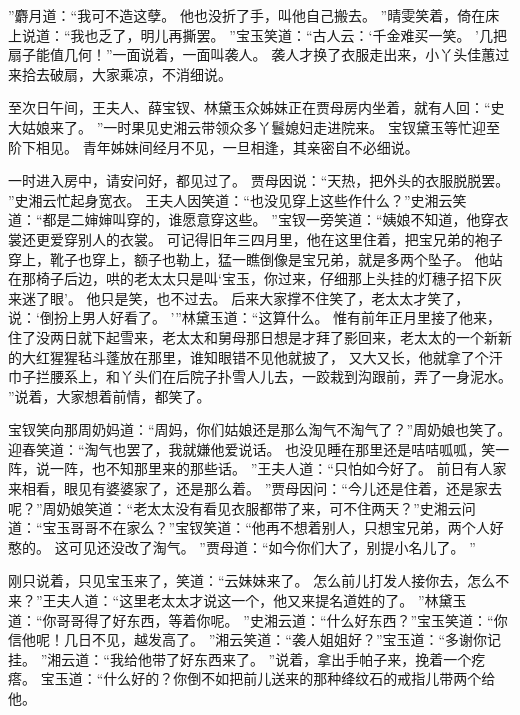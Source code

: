 ”麝月道：“我可不造这孽。
他也没折了手，叫他自己搬去。
”晴雯笑着，倚在床上说道：“我也乏了，明儿再撕罢。
”宝玉笑道：“古人云：‘千金难买一笑。
’几把扇子能值几何！”一面说着，一面叫袭人。
袭人才换了衣服走出来，小丫头佳蕙过来拾去破扇，大家乘凉，不消细说。
\par
至次日午间，王夫人、薛宝钗、林黛玉众姊妹正在贾母房内坐着，就有人回：“史大姑娘来了。
”一时果见史湘云带领众多丫鬟媳妇走进院来。
宝钗黛玉等忙迎至阶下相见。
青年姊妹间经月不见，一旦相逢，其亲密自不必细说。
\par
一时进入房中，请安问好，都见过了。
贾母因说：“天热，把外头的衣服脱脱罢。
”史湘云忙起身宽衣。
王夫人因笑道：“也没见穿上这些作什么？”史湘云笑道：“都是二婶婶叫穿的，谁愿意穿这些。
”宝钗一旁笑道：“姨娘不知道，他穿衣裳还更爱穿别人的衣裳。
可记得旧年三四月里，他在这里住着，把宝兄弟的袍子穿上，靴子也穿上，额子也勒上，猛一瞧倒像是宝兄弟，就是多两个坠子。
他站在那椅子后边，哄的老太太只是叫‘宝玉，你过来，仔细那上头挂的灯穗子招下灰来迷了眼’。
他只是笑，也不过去。
后来大家撑不住笑了，老太太才笑了，说：‘倒扮上男人好看了。
’”林黛玉道：“这算什么。
惟有前年正月里接了他来，住了没两日就下起雪来，老太太和舅母那日想是才拜了影回来，老太太的一个新新的大红猩猩毡斗蓬放在那里，谁知眼错不见他就披了，
又大又长，他就拿了个汗巾子拦腰系上，和丫头们在后院子扑雪人儿去，一跤栽到沟跟前，弄了一身泥水。
”说着，大家想着前情，都笑了。
\par
宝钗笑向那周奶妈道：“周妈，你们姑娘还是那么淘气不淘气了？”周奶娘也笑了。
迎春笑道：“淘气也罢了，我就嫌他爱说话。
也没见睡在那里还是咭咭呱呱，笑一阵，说一阵，也不知那里来的那些话。
”王夫人道：“只怕如今好了。
前日有人家来相看，眼见有婆婆家了，还是那么着。
”贾母因问：“今儿还是住着，还是家去呢？”周奶娘笑道：“老太太没有看见衣服都带了来，可不住两天？”史湘云问道：“宝玉哥哥不在家么？”宝钗笑道：“他再不想着别人，只想宝兄弟，两个人好憨的。
这可见还没改了淘气。
”贾母道：“如今你们大了，别提小名儿了。
”\par
刚只说着，只见宝玉来了，笑道：“云妹妹来了。
怎么前儿打发人接你去，怎么不来？”王夫人道：“这里老太太才说这一个，他又来提名道姓的了。
”林黛玉道：“你哥哥得了好东西，等着你呢。
”史湘云道：“什么好东西？”宝玉笑道：“你信他呢！几日不见，越发高了。
”湘云笑道：“袭人姐姐好？”宝玉道：“多谢你记挂。
”湘云道：“我给他带了好东西来了。
”说着，拿出手帕子来，挽着一个疙瘩。
宝玉道：“什么好的？你倒不如把前儿送来的那种绛纹石的戒指儿带两个给他。
